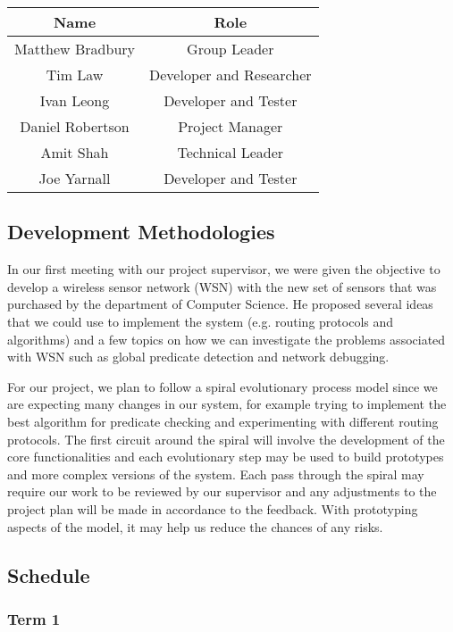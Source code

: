 \documentclass[a4paper]{article}
\begin{document}
\begin{table}[H]
\centering
	\begin{tabular}{| c | c |}
		\hline
		Name & Role\\
		\hline
		Matthew Bradbury & Group Leader\\
		Tim Law & Developer and Researcher\\
		Ivan Leong & Developer and Tester\\
		Daniel Robertson & Project Manager\\
		Amit Shah & Technical Leader\\
		Joe Yarnall & Developer and Tester\\
		\hline
	\end{tabular}
\end{table}



\subsection{Development Methodologies}
In our first meeting with our project supervisor, we were given the objective to develop a wireless sensor network (WSN) with the new set of sensors that was purchased by the department of Computer Science. He proposed several ideas that we could use to implement the system (e.g. routing protocols and algorithms) and a few topics on how we can investigate the problems associated with WSN such as global predicate detection and network debugging. 

For our project, we plan to follow a spiral evolutionary process model since we are expecting many changes in our system, for example trying to implement the best algorithm for predicate checking and experimenting with different routing protocols. The first circuit around the spiral will involve the development of the core functionalities and each evolutionary step may be used to build prototypes and more complex versions of the system. Each pass through the spiral may require our work to be reviewed by our supervisor and any adjustments to the project plan will be made in accordance to the feedback. With prototyping aspects of the model, it may help us reduce the chances of any risks.



\subsection{Schedule}

\subsubsection{Term 1}
\end{document}
